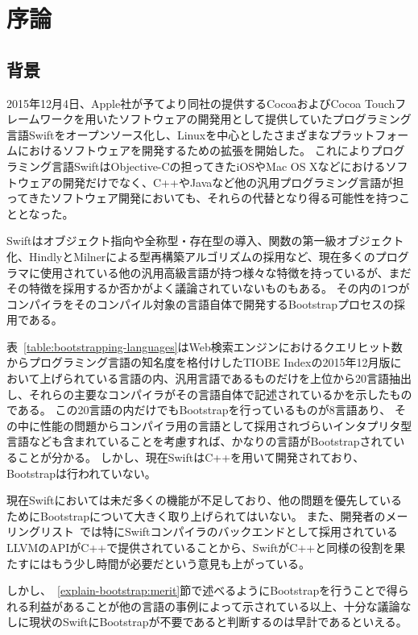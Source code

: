 \chapter{序論}
\label{introduction}

\section{背景}
\label{introduction:background}

2015年12月4日、Apple社が予てより同社の提供するCocoaおよびCocoa Touchフレームワークを用いたソフトウェアの開発用として提供していたプログラミング言語Swiftをオープンソース化し、Linuxを中心としたさまざまなプラットフォームにおけるソフトウェアを開発するための拡張を開始した。
これによりプログラミング言語SwiftはObjective-Cの担ってきたiOSやMac OS Xなどにおけるソフトウェアの開発だけでなく、C++やJavaなど他の汎用プログラミング言語が担ってきたソフトウェア開発においても、それらの代替となり得る可能性を持つこととなった。

Swiftはオブジェクト指向や全称型・存在型の導入、関数の第一級オブジェクト化、HindlyとMilnerによる型再構築アルゴリズムの採用など、現在多くのプログラマに使用されている他の汎用高級言語が持つ様々な特徴を持っているが、まだその特徴を採用するか否かがよく議論されていないものもある。
その内の1つがコンパイラをそのコンパイル対象の言語自体で開発するBootstrapプロセスの採用である。

表~\ref{table:bootstrapping-languages}はWeb検索エンジンにおけるクエリヒット数からプログラミング言語の知名度を格付けしたTIOBE Indexの2015年12月版において上げられている言語の内、汎用言語であるものだけを上位から20言語抽出し、それらの主要なコンパイラがその言語自体で記述されているかを示したものである。
この20言語の内だけでもBootstrapを行っているものが8言語あり、 その中に性能の問題からコンパイラ用の言語として採用されづらいインタプリタ型言語なども含まれていることを考慮すれば、かなりの言語がBootstrapされていることが分かる。
しかし、現在SwiftはC++を用いて開発されており、Bootstrapは行われていない。

現在Swiftにおいては未だ多くの機能が不足しており、他の問題を優先しているためにBootstrapについて大きく取り上げられてはいない。
また、開発者のメーリングリスト~\cite{dev-ml}では特にSwiftコンパイラのバックエンドとして採用されているLLVMのAPIがC++で提供されていることから、SwiftがC++と同様の役割を果たすにはもう少し時間が必要だという意見も上がっている。


しかし、~\ref{explain-bootstrap:merit}節で述べるようにBootstrapを行うことで得られる利益があることが他の言語の事例によって示されている以上、十分な議論なしに現状のSwiftにBootstrapが不要であると判断するのは早計であるといえる。

